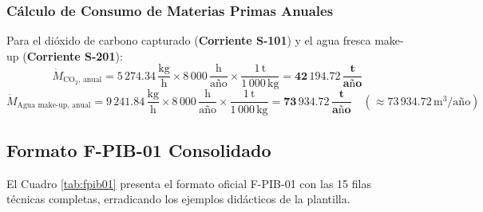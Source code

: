 \documentclass[10pt,letterpaper]{article}
\begin{document}
\subsubsection{Cálculo de Consumo de Materias Primas Anuales}
Para el dióxido de carbono capturado (\textbf{Corriente S-101}) y el agua fresca make-up (\textbf{Corriente S-201}):
\begin{equation}
\dot{M}_{\text{CO}_2\text{, anual}} = 5\,274.34\,\frac{\text{kg}}{\text{h}} \times 8\,000\,\frac{\text{h}}{\text{año}} \times \frac{1\,\text{t}}{1\,000\,\text{kg}} = \mathbf{42\,194.72\,\frac{\text{t}}{\text{año}}}
\end{equation}
\begin{equation}
\dot{M}_{\text{Agua make-up, anual}} = 9\,241.84\,\frac{\text{kg}}{\text{h}} \times 8\,000\,\frac{\text{h}}{\text{año}} \times \frac{1\,\text{t}}{1\,000\,\text{kg}} = \mathbf{73\,934.72\,\frac{\text{t}}{\text{año}}} \quad (\approx 73\,934.72\,\text{m}^3\text{/año})
\end{equation}

\subsection{Formato F-PIB-01 Consolidado}
El Cuadro \ref{tab:fpib01} presenta el formato oficial F-PIB-01 con las 15 filas técnicas completas, erradicando los ejemplos didácticos de la plantilla.
\end{document}
